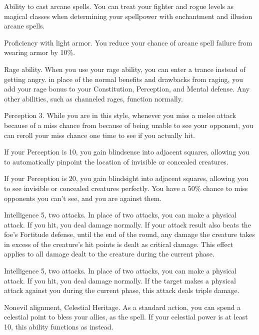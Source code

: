 \featpre Ability to cast arcane spells.
\featben You can treat your fighter and rogue levels as magical classes when determining your spellpower with enchantment and illusion arcane spells.

\featpre Proficiency with light armor.
\featben You reduce your chance of arcane spell failure from wearing armor by 10\%.

\featpre Rage ability.
\featben When you use your rage ability, you can enter a trance instead of getting angry.
in place of the normal benefits and drawbacks from raging, you add your rage bonus to your Constitution, Perception, and Mental defense.
Any other abilities, such as channeled rages, function normally.

\featpre Perception 3.
\featben While you are in this style, whenever you miss a melee attack because of a miss chance from because of being unable to see your opponent, you can reroll your miss chance one time to see if you actually hit.
\par If your Perception is 10, you gain blindsense into adjacent squares, allowing you to automatically pinpoint the location of invisible or concealed creatures.
\par If your Perception is 20, you gain blindsight into adjacent squares, allowing you to see invisible or concealed creatures perfectly.
You have a 50\% chance to miss opponents you can't see, and you are  against them.

\featpre Intelligence 5, two attacks.
\featben In place of two attacks, you can make a physical attack.
If you hit, you deal damage normally.
If your attack result also beats the foe's Fortitude defense, until the end of the round, any damage the creature takes in excess of the creature's hit points is dealt as critical damage.
This effect applies to all damage dealt to the creature during the current phase.

\featpre Intelligence 5, two attacks.
\featben In place of two attacks, you can make a physical attack.
If you hit, you deal damage normally.
If the target makes a physical attack against you during the current phase, this attack deals triple damage.

\featpres
Nonevil alignment, Celestial Heritage.
\featben As a standard action, you can spend a celestial point to bless your allies, as the  spell.
If your celestial power is at least 10, this ability functions as  instead.

